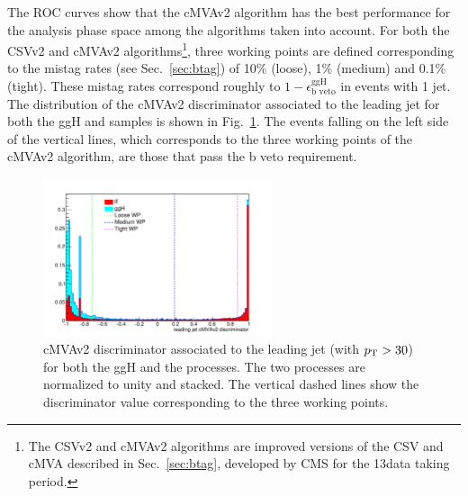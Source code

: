 The ROC curves show that the cMVAv2 algorithm has the best performance for the analysis phase space among the algorithms taken into account. For both the CSVv2 and cMVAv2 algorithms\footnote{The CSVv2 and cMVAv2 algorithms are improved versions of the CSV and cMVA described in Sec.~\ref{sec:btag}, developed by CMS for the 13\TeV data taking period.}, three working points are defined corresponding to the mistag rates (see Sec.~\ref{sec:btag}) of 10\% (loose), 1\% (medium) and 0.1\% (tight). These mistag rates correspond roughly to $1-\epsilon_\text{b veto}^\text{ggH}$ in events with 1 jet. The distribution of the cMVAv2 discriminator associated to the leading jet for both the ggH and \ttbar samples is shown in Fig.~\ref{fig:discriminator}. The events falling on the left side of the vertical lines, which corresponds to the three working points of the cMVAv2 algorithm, are those that pass the b veto requirement.

\begin{figure}[htb]
\centering
\includegraphics[width=0.6\textwidth]{images/13TeV/cmva_WP.pdf}
\caption{cMVAv2 discriminator associated to the leading jet (with $p_\mathrm{T} > 30$\GeV) for both the ggH and the \ttbar processes. The two processes are normalized to unity and stacked. The vertical dashed lines show the discriminator value corresponding to the three working points.}\label{fig:discriminator}
\end{figure}

